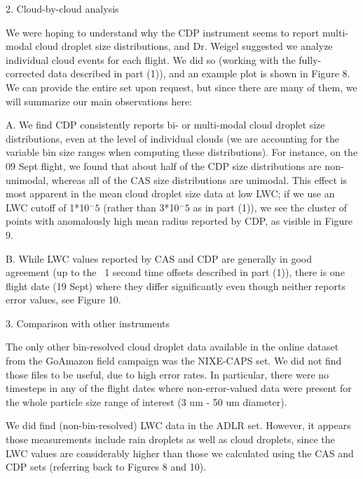 \documentclass{article}
\begin{document}
\begin{itemize}
{2. Cloud-by-cloud analysis

We were hoping to understand why the CDP instrument seems to report multi-modal cloud droplet size distributions, and Dr. Weigel suggested we analyze individual cloud events for each flight. We did so (working with the fully-corrected data described in part (1)), and an example plot is shown in Figure 8. We can provide the entire set upon request, but since there are many of them, we will summarize our main observations here:

A. We find CDP consistently reports bi- or multi-modal cloud droplet size distributions, even at the level of individual clouds (we are accounting for the variable bin size ranges when computing these distributions). For instance, on the 09 Sept flight, we found that about half of the CDP size distributions are non-unimodal, whereas all of the CAS size distributions are unimodal. This effect is most apparent in the mean cloud droplet size data at low LWC; if we use an LWC cutoff of 1*10$^-5$ (rather than 3*10$^-5$ as in part (1)), we see the cluster of points with anomalously high mean radius reported by CDP, as visible in Figure 9.

B. While LWC values reported by CAS and CDP are generally in good agreement (up to the ~1 second time offsets described in part (1)), there is one flight date (19 Sept) where they differ significantly even though neither reports error values, see Figure 10.

3. Comparison with other instruments

The only other bin-resolved cloud droplet data available in the online dataset from the GoAmazon field campaign was the NIXE-CAPS set. We did not find those files to be useful, due to high error rates. In particular, there were no timesteps in any of the flight dates where non-error-valued data were present for the whole particle size range of interest (3 um - 50 um diameter).

We did find (non-bin-resolved) LWC data in the ADLR set. However, it appears those measurements include rain droplets as well as cloud droplets, since the LWC values are considerably higher than those we calculated using the CAS and CDP sets (referring back to Figures 8 and 10).}\\


\end{itemize}
\end{document}
